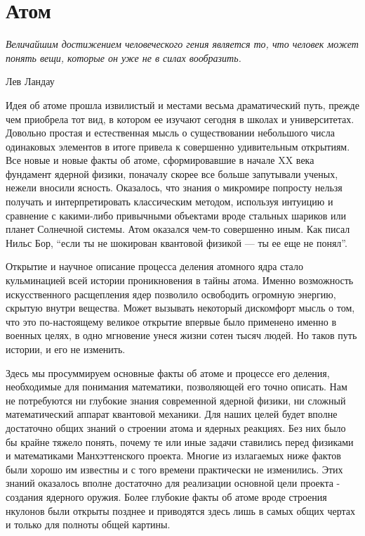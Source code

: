 \chapter{Атом}\label{ch:atom}

\epigraph{\emph{Величайшим достижением человеческого гения является то, что человек может понять вещи, которые он уже не в силах вообразить.}}
{Лев Ландау}


Идея об атоме прошла извилистый и местами весьма драматический путь, прежде чем приобрела тот вид, в котором ее изучают сегодня в школах и университетах.
Довольно простая и естественная мысль о существовании небольшого числа одинаковых элементов в итоге привела к совершенно удивительным открытиям.
Все новые и новые факты об атоме, сформировавшие в начале XX века фундамент ядерной физики, поначалу скорее все больше запутывали ученых, нежели вносили ясность.
Оказалось, что знания о микромире попросту нельзя получать и интерпретировать классическим методом, используя интуицию и сравнение с какими-либо привычными объектами вроде стальных шариков или планет Солнечной системы.
Атом оказался чем-то совершенно иным.
Как писал Нильс Бор, ``если ты не шокирован квантовой физикой — ты ее еще не понял''.

Открытие и научное описание процесса деления атомного ядра стало кульминацией всей истории проникновения в тайны атома. 
Именно возможность искусственного расщепления ядер позволило освободить огромную энергию, скрытую внутри вещества.
Может вызывать некоторый дискомфорт мысль о том, что это по-настоящему великое открытие впервые было применено именно в военных целях, в одно мгновение унеся жизни сотен тысяч людей.
Но таков путь истории, и его не изменить.

Здесь мы просуммируем основные факты об атоме и процессе его деления, необходимые для понимания математики, позволяющей его точно описать.
Нам не потребуются ни глубокие знания современной ядерной физики, ни сложный математический аппарат квантовой механики.
Для наших целей будет вполне достаточно общих знаний о строении атома и ядерных реакциях.
Без них было бы крайне тяжело понять, почему те или иные задачи ставились перед физиками и математиками Манхэттенского проекта.
Многие из излагаемых ниже фактов были хорошо им известны и с того времени практически не изменились.  
Этих знаний оказалось вполне достаточно для реализации основной цели проекта - создания ядерного оружия.
Более глубокие факты об атоме вроде строения нкулонов были открыты позднее и приводятся здесь лишь в самых общих чертах и только для полноты общей картины.


